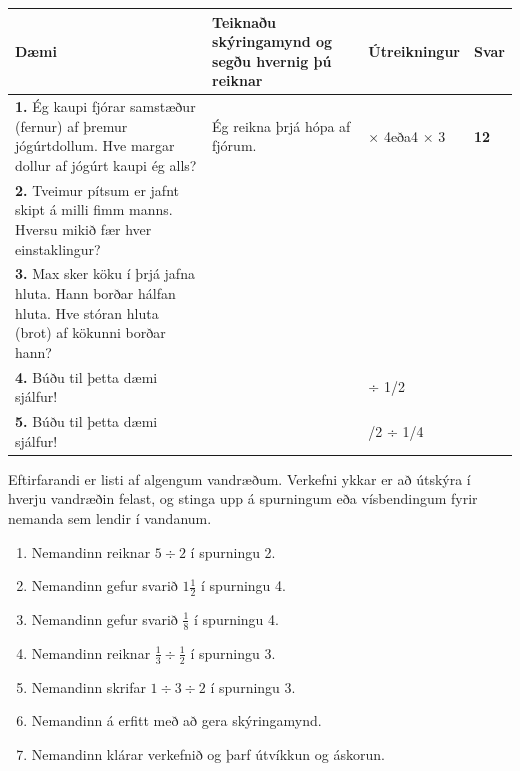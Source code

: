 \documentclass[
  icelandic,
]{book}
\providecommand{\tightlist}{%
  \setlength{\itemsep}{0pt}\setlength{\parskip}{0pt}}
\begin{document}
\begin{longtable}[]{@{}
  >{\raggedright\arraybackslash}p{}
  >{\raggedright\arraybackslash}p{}
  >{\raggedright\arraybackslash}p{}
  >{\raggedright\arraybackslash}p{}@{}}
\toprule\noalign{}
\begin{minipage}[b]{\linewidth}\raggedright
\textbf{Dæmi}
\end{minipage} & \begin{minipage}[b]{\linewidth}\raggedright
\textbf{Teiknaðu skýringamynd og segðu hvernig þú reiknar}
\end{minipage} & \begin{minipage}[b]{\linewidth}\raggedright
\textbf{Útreikningur}
\end{minipage} & \begin{minipage}[b]{\linewidth}\raggedright
\textbf{Svar}
\end{minipage} \\
\midrule\noalign{}
\endhead
\bottomrule\noalign{}
\endlastfoot
\textbf{1.} Ég kaupi fjórar samstæður (fernur) af þremur jógúrtdollum. Hve margar dollur af jógúrt kaupi ég alls? & Ég reikna þrjá hópa af fjórum. & 3 × 4eða4 × 3 & \textbf{12} \\
\textbf{2.} Tveimur pítsum er jafnt skipt á milli fimm manns. Hversu mikið fær hver einstaklingur? & & & \\
\textbf{3.} Max sker köku í þrjá jafna hluta. Hann borðar hálfan hluta. Hve stóran hluta (brot) af kökunni borðar hann? & & & \\
\textbf{4.} Búðu til þetta dæmi sjálfur! & & 3 ÷ 1/2 & \\
\textbf{5.} Búðu til þetta dæmi sjálfur! & & 1/2 ÷ 1/4 & \\
\end{longtable}

Eftirfarandi er listi af algengum vandræðum. Verkefni ykkar er að útskýra í hverju vandræðin felast, og stinga upp á spurningum eða vísbendingum fyrir nemanda sem lendir í vandanum.

\begin{enumerate}
\def\labelenumi{\arabic{enumi}.}
\tightlist
\item
  Nemandinn reiknar \(5 \div 2\) í spurningu 2.
\item
  Nemandinn gefur svarið \(1 \frac{1}{2}\) í spurningu 4.
\item
  Nemandinn gefur svarið \(\frac{1}{8}\) í spurningu 4.
\item
  Nemandinn reiknar \(\frac{1}{3} \div \frac{1}{2}\) í spurningu 3.
\item
  Nemandinn skrifar \(1 \div 3 \div 2\) í spurningu 3.
\item
  Nemandinn á erfitt með að gera skýringamynd.
\item
  Nemandinn klárar verkefnið og þarf útvíkkun og áskorun.
\end{enumerate}
\end{document}
